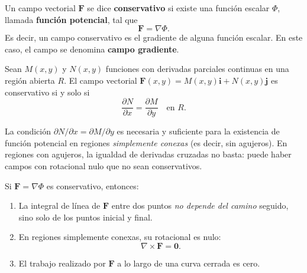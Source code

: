 Un campo vectorial \(\mathbf{F}\) se dice \textbf{conservativo} si
existe una función escalar \(\Phi\), llamada \textbf{función
potencial}, tal que
\[
\mathbf{F} = \nabla \Phi.
\]
Es decir, un campo conservativo es el gradiente de alguna función
escalar. En este caso, el campo se denomina \textbf{campo gradiente}.

\begin{theorem}
Sean \(M(x,y)\) y \(N(x,y)\) funciones con derivadas parciales continuas
en una región abierta \(R\). El campo vectorial
\(\mathbf{F}(x,y) = M(x,y)\mathbf{i} + N(x,y)\mathbf{j}\) es
conservativo si y solo si
\[
\frac{\partial N}{\partial x} = \frac{\partial M}{\partial y}
\quad \text{en } R.
\]
\end{theorem}

\begin{rem}
La condición \(\partial N/\partial x = \partial M/\partial y\) es
necesaria y suficiente para la existencia de función potencial en
regiones \emph{simplemente conexas} (es decir, sin agujeros). En
regiones con agujeros, la igualdad de derivadas cruzadas no basta:
puede haber campos con rotacional nulo que no sean conservativos.
\end{rem}

\begin{rem}
Si \(\mathbf{F} = \nabla \Phi\) es conservativo, entonces:
\begin{enumerate}
  \item La integral de línea de \(\mathbf{F}\) entre dos puntos
  \emph{no depende del camino} seguido, sino solo de los puntos
  inicial y final.
  \item En regiones simplemente conexas, su rotacional es nulo:
  \[
  \nabla \times \mathbf{F} = \mathbf{0}.
  \]
  \item El trabajo realizado por \(\mathbf{F}\) a lo largo de una
  curva cerrada es cero.
\end{enumerate}
\end{rem}

